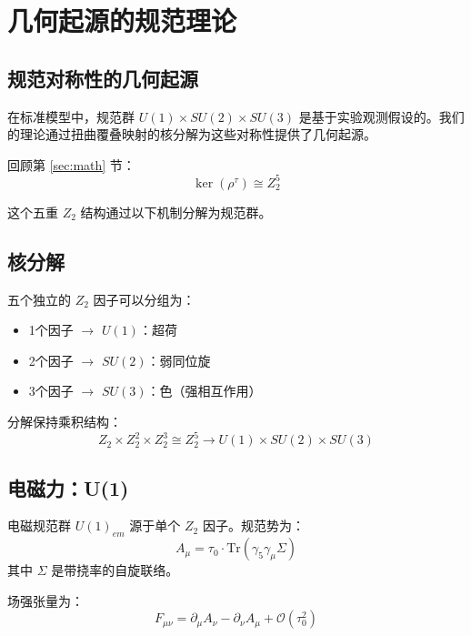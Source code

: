 \section{几何起源的规范理论}
\label{sec:gauge}

\subsection{规范对称性的几何起源}

在标准模型中，规范群 $U(1) \times SU(2) \times SU(3)$ 是基于实验观测假设的。我们的理论通过扭曲覆叠映射的核分解为这些对称性提供了几何起源。

回顾第 \ref{sec:math} 节：
\begin{equation}
    \ker(\rho^\tau) \cong Z_2^5
\end{equation}

这个五重 $Z_2$ 结构通过以下机制分解为规范群。

\subsection{核分解}

五个独立的 $Z_2$ 因子可以分组为：
\begin{itemize}
    \item 1个因子 $\to$ $U(1)$：超荷
    \item 2个因子 $\to$ $SU(2)$：弱同位旋
    \item 3个因子 $\to$ $SU(3)$：色（强相互作用）
\end{itemize}

分解保持乘积结构：
\begin{equation}
    Z_2 \times Z_2^2 \times Z_2^3 \cong Z_2^5 \to U(1) \times SU(2) \times SU(3)
\end{equation}

\subsection{电磁力：U(1)}

电磁规范群 $U(1)_{em}$ 源于单个 $Z_2$ 因子。规范势为：
\begin{equation}
    A_\mu = \tau_0 \cdot \text{Tr}(\gamma_5 \gamma_\mu \Sigma)
\end{equation}
其中 $\Sigma$ 是带挠率的自旋联络。

场强张量为：
\begin{equation}
    F_{\mu\nu} = \partial_\mu A_\nu - \partial_\nu A_\mu + \mathcal{O}(\tau_0^2)
\end{equation}

